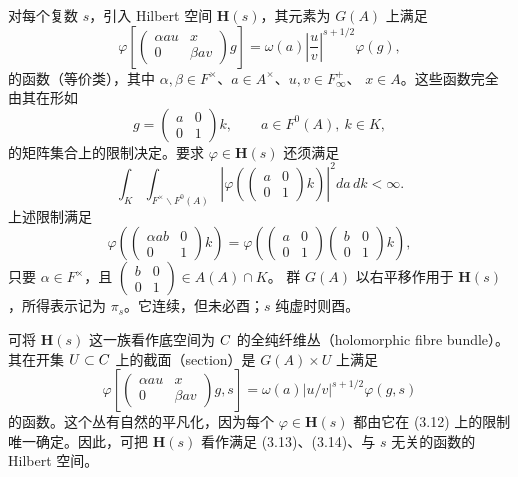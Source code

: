 对每个复数 $s$，引入 Hilbert 空间 $\mathbf H(s)$，其元素为 $G(A)$ 上满足
\begin{equation}
 \varphi\!\left[\begin{pmatrix}\alpha au&x\\0&\beta av\end{pmatrix}g\right]
 =\omega(a)\left|\frac uv\right|^{s+1/2}\varphi(g),\tag{3.11}
\end{equation}
的函数（等价类），其中 $\alpha,\beta\in F^\times$、$a\in A^\times$、$u,v\in F_\infty^+$、
$x\in A$。这些函数完全由其在形如
\begin{equation}
 g=\begin{pmatrix}a&0\\0&1\end{pmatrix}k,
 \qquad a\in F^0(A),\ k\in K,\tag{3.12}
\end{equation}
的矩阵集合上的限制决定。要求 $\varphi\in\mathbf H(s)$ 还须满足
\begin{equation}
 \int_K\int_{F^\times\backslash F^0(A)}
 \left|\varphi\!\left(\begin{pmatrix}a&0\\0&1\end{pmatrix}k\right)\right|^2da\,dk<\infty.\tag{3.13}
\end{equation}
上述限制满足
\begin{equation}
 \varphi\!\left(\begin{pmatrix}\alpha ab&0\\0&1\end{pmatrix}k\right)
 =\varphi\!\left(\begin{pmatrix}a&0\\0&1\end{pmatrix}\begin{pmatrix}b&0\\0&1\end{pmatrix}k\right),\tag{3.14}
\end{equation}
只要 $\alpha\in F^\times$，且 $\left(\begin{smallmatrix}b&0\\0&1\end{smallmatrix}\right)\in A(A)\cap K$。
群 $G(A)$ 以右平移作用于 $\mathbf H(s)$，所得表示记为 $\pi_s$。它连续，但未必酉；$s$ 纯虚时则酉。

可将 $\mathbf H(s)$ 这一族看作底空间为 $C$ 的全纯纤维丛（holomorphic fibre bundle）。其在开集
$U\subset C$ 上的截面（section）是 $G(A)\times U$ 上满足
\[
 \varphi\!\left[\begin{pmatrix}\alpha au&x\\0&\beta av\end{pmatrix}g,s\right]
 =\omega(a)|u/v|^{s+1/2}\varphi(g,s)
\]
的函数。这个丛有自然的平凡化，因为每个 $\varphi\in\mathbf H(s)$ 都由它在 (3.12) 上的限制唯一确定。因此，可把 $\mathbf H(s)$ 看作满足 (3.13)、(3.14)、与 $s$ 无关的函数的 Hilbert 空间。

